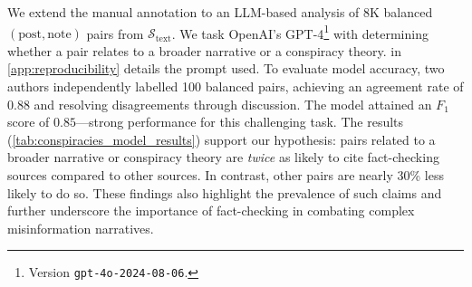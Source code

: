 We extend the manual annotation to an LLM-based analysis of 8K balanced $(\text{post}, \text{note})$ pairs from $\mathcal{S}_\text{text}$. We task OpenAI's GPT-4\footnote{Version \texttt{gpt-4o-2024-08-06}.} with determining whether a pair relates to a broader narrative or a conspiracy theory.  in \cref{app:reproducibility} details the prompt used. To evaluate model accuracy, two authors independently labelled 100 balanced pairs, achieving an agreement rate of $0.88$ and resolving disagreements through discussion. The model attained an 
$F_1$ score of $0.85$---strong performance for this challenging task. The results (\cref{tab:conspiracies_model_results}) support our hypothesis: pairs related to a broader narrative or conspiracy theory are \textit{twice} as likely to cite fact-checking sources compared to other sources. In contrast, other pairs are nearly 30\% less likely to do so. These findings also highlight the prevalence of such claims and further underscore the importance of fact-checking in combating complex misinformation narratives.




